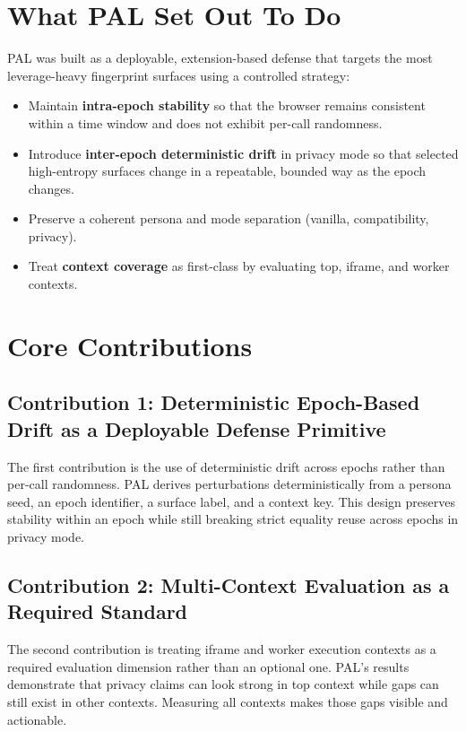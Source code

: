 \documentclass[11pt]{report}
\begin{document}
\section{What PAL Set Out To Do}

PAL was built as a deployable, extension-based defense that targets the most leverage-heavy fingerprint surfaces using a controlled strategy:

\begin{itemize}
    \item Maintain \textbf{intra-epoch stability} so that the browser remains consistent within a time window and does not exhibit per-call randomness.
    \item Introduce \textbf{inter-epoch deterministic drift} in privacy mode so that selected high-entropy surfaces change in a repeatable, bounded way as the epoch changes.
    \item Preserve a coherent persona and mode separation (vanilla, compatibility, privacy).
    \item Treat \textbf{context coverage} as first-class by evaluating top, iframe, and worker contexts.
\end{itemize}

\section{Core Contributions}

\subsection{Contribution 1: Deterministic Epoch-Based Drift as a Deployable Defense Primitive}

The first contribution is the use of deterministic drift across epochs rather than per-call randomness. PAL derives perturbations deterministically from a persona seed, an epoch identifier, a surface label, and a context key. This design preserves stability within an epoch while still breaking strict equality reuse across epochs in privacy mode.

\subsection{Contribution 2: Multi-Context Evaluation as a Required Standard}

The second contribution is treating iframe and worker execution contexts as a required evaluation dimension rather than an optional one. PAL’s results demonstrate that privacy claims can look strong in top context while gaps can still exist in other contexts. Measuring all contexts makes those gaps visible and actionable.
\end{document}
